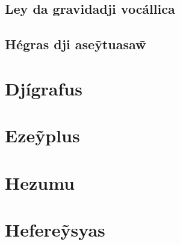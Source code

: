 \documentclass[12pt, a5paper, titlepage]{article}
\begin{document}
\begin{bilingualpages}
    \subsection{Ley da gravidadji vocállica}
    \subsection{Hégras dji ase\~ytuasa\~w}

    \section{Djígrafus}

    \BrTableDigraphs

    \section{Eze\~yplus}

\end{bilingualpages}

\newpage
\section{Hezumu}

\newpage
\section{Hefere\~ysyas}
\end{document}
